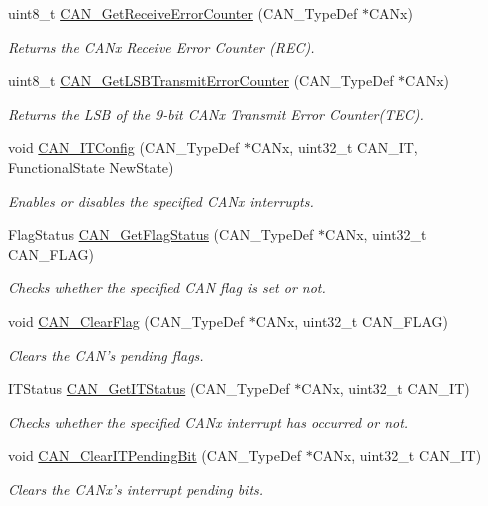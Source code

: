 \begin{DoxyCompactItemize}
uint8\-\_\-t \hyperlink{group___c_a_n_ga6903eecbec40eb1361d915ddde9a3274}{C\-A\-N\-\_\-\-Get\-Receive\-Error\-Counter} (C\-A\-N\-\_\-\-Type\-Def $\ast$C\-A\-Nx)
\begin{DoxyCompactList}\small\item\em Returns the C\-A\-Nx Receive Error Counter (R\-E\-C). \end{DoxyCompactList}\item 
uint8\-\_\-t \hyperlink{group___c_a_n_ga85ee0c35bf7ca15d4e4c862eef534843}{C\-A\-N\-\_\-\-Get\-L\-S\-B\-Transmit\-Error\-Counter} (C\-A\-N\-\_\-\-Type\-Def $\ast$C\-A\-Nx)
\begin{DoxyCompactList}\small\item\em Returns the L\-S\-B of the 9-\/bit C\-A\-Nx Transmit Error Counter(\-T\-E\-C). \end{DoxyCompactList}\item 
void \hyperlink{group___c_a_n_gad1a8b2499a780b5bfa4accb3597b02f4}{C\-A\-N\-\_\-\-I\-T\-Config} (C\-A\-N\-\_\-\-Type\-Def $\ast$C\-A\-Nx, uint32\-\_\-t C\-A\-N\-\_\-\-I\-T, Functional\-State New\-State)
\begin{DoxyCompactList}\small\item\em Enables or disables the specified C\-A\-Nx interrupts. \end{DoxyCompactList}\item 
Flag\-Status \hyperlink{group___c_a_n_ga2faad96caf823ef463cc5b5b25c480bb}{C\-A\-N\-\_\-\-Get\-Flag\-Status} (C\-A\-N\-\_\-\-Type\-Def $\ast$C\-A\-Nx, uint32\-\_\-t C\-A\-N\-\_\-\-F\-L\-A\-G)
\begin{DoxyCompactList}\small\item\em Checks whether the specified C\-A\-N flag is set or not. \end{DoxyCompactList}\item 
void \hyperlink{group___c_a_n_ga2c01646d5d3a2d7045e8dd71f58f8742}{C\-A\-N\-\_\-\-Clear\-Flag} (C\-A\-N\-\_\-\-Type\-Def $\ast$C\-A\-Nx, uint32\-\_\-t C\-A\-N\-\_\-\-F\-L\-A\-G)
\begin{DoxyCompactList}\small\item\em Clears the C\-A\-N's pending flags. \end{DoxyCompactList}\item 
I\-T\-Status \hyperlink{group___c_a_n_ga9aca05b3013e1b3438f3559f80b33c82}{C\-A\-N\-\_\-\-Get\-I\-T\-Status} (C\-A\-N\-\_\-\-Type\-Def $\ast$C\-A\-Nx, uint32\-\_\-t C\-A\-N\-\_\-\-I\-T)
\begin{DoxyCompactList}\small\item\em Checks whether the specified C\-A\-Nx interrupt has occurred or not. \end{DoxyCompactList}\item 
void \hyperlink{group___c_a_n_ga30bf7ac0c1793f6622a4a1adbb7dbc8a}{C\-A\-N\-\_\-\-Clear\-I\-T\-Pending\-Bit} (C\-A\-N\-\_\-\-Type\-Def $\ast$C\-A\-Nx, uint32\-\_\-t C\-A\-N\-\_\-\-I\-T)
\begin{DoxyCompactList}\small\item\em Clears the C\-A\-Nx's interrupt pending bits. \end{DoxyCompactList}\end{DoxyCompactItemize}


